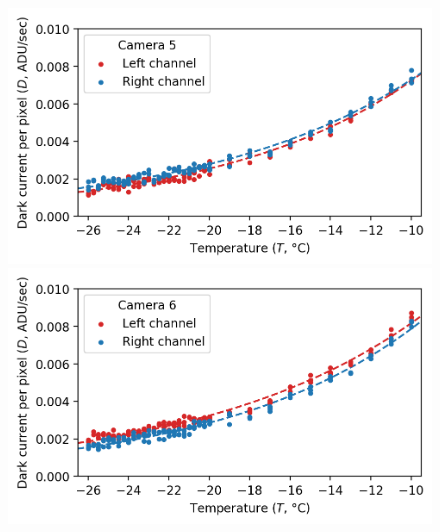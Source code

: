 \begin{colsection}
\begin{figure}[p]
\begin{center}
        \begin{minipage}[t]{0.49\linewidth}\vspace{10pt}
            \includegraphics[width=\linewidth]{images/detectors/dc_5.png}
        \end{minipage}
        \begin{minipage}[t]{0.49\linewidth}\vspace{10pt}
            \includegraphics[width=\linewidth]{images/detectors/dc_6.png}
        \end{minipage}


\end{center}
\end{figure}
\end{colsection}
